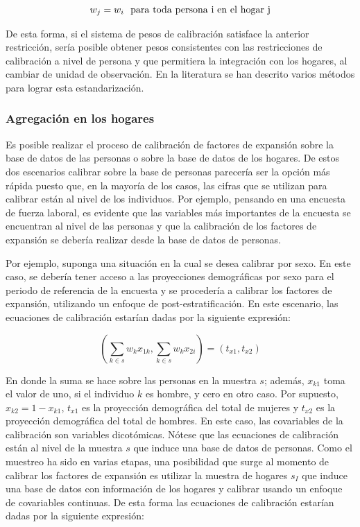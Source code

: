 \documentclass[
  10pt,
  spanish,
]{book}
\begin{document}
\[
w_j=w_i\ \rm \ para\ toda\ persona\ i\ en\ el\ hogar\ j
\]

De esta forma, si el sistema de pesos de calibración satisface la anterior restricción, sería posible obtener pesos consistentes con las restricciones de calibración a nivel de persona y que permitiera la integración con los hogares, al cambiar de unidad de observación. En la literatura se han descrito varios métodos para lograr esta estandarización.

\hypertarget{agregaciuxf3n-en-los-hogares}{%
\subsubsection*{Agregación en los hogares}\label{agregaciuxf3n-en-los-hogares}}

Es posible realizar el proceso de calibración de factores de expansión sobre la base de datos de las personas o sobre la base de datos de los hogares. De estos dos escenarios calibrar sobre la base de personas parecería ser la opción más rápida puesto que, en la mayoría de los casos, las cifras que se utilizan para calibrar están al nivel de los individuos. Por ejemplo, pensando en una encuesta de fuerza laboral, es evidente que las variables más importantes de la encuesta se encuentran al nivel de las personas y que la calibración de los factores de expansión se debería realizar desde la base de datos de personas.

Por ejemplo, suponga una situación en la cual se desea calibrar por sexo. En este caso, se debería tener acceso a las proyecciones demográficas por sexo para el periodo de referencia de la encuesta y se procedería a calibrar los factores de expansión, utilizando un enfoque de post-estratificación. En este escenario, las ecuaciones de calibración estarían dadas por la siguiente expresión:

\[
\left ( \sum_{k \in s} w_k x_{1k}, \sum_{k \in s} w_k x_{2i} \right )=(t_{x1}, t_{x2})
\]

En donde la suma se hace sobre las personas en la muestra \(s\); además, \(x_{k1}\) toma el valor de uno, si el individuo \(k\) es hombre, y cero en otro caso. Por supuesto, \(x_{k2} = 1 - x_{k1}\), \(t_{x1}\) es la proyección demográfica del total de mujeres y \(t_{x2}\) es la proyección demográfica del total de hombres. En este caso, las covariables de la calibración son variables dicotómicas. Nótese que las ecuaciones de calibración están al nivel de la muestra \(s\) que induce una base de datos de personas. Como el muestreo ha sido en varias etapas, una posibilidad que surge al momento de calibrar los factores de expansión es utilizar la muestra de hogares \(s_I\) que induce una base de datos con información de los hogares y calibrar usando un enfoque de covariables continuas. De esta forma las ecuaciones de calibración estarían dadas por la siguiente expresión:
\end{document}
